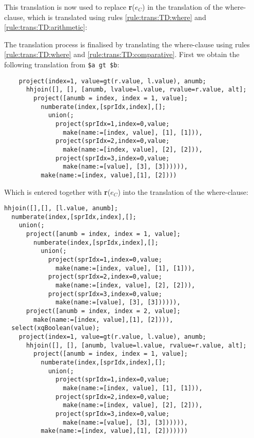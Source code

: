 This translation is now used to replace \textbf{r}($e_C$) in the translation
of the where-clause, which is translated using rules \ref{rule:trans:TD:where}
and \ref{rule:trans:TD:arithmetic}:

The translation process is finalised by translating the where-clause using rules
\ref{rule:trans:TD:where} and \ref{rule:trans:TD:comparative}. First we
obtain the following translation from \texttt{\$a gt \$b}:

\begin{Verbatim}
    project(index=1, value=gt(r.value, l.value), anumb;
      hhjoin([], [], [anumb, lvalue=l.value, rvalue=r.value, alt];
        project([anumb = index, index = 1, value];
          numberate(index,[sprIdx,index],[];
            union(;
              project(sprIdx=1,index=0,value;
                make(name:=[index, value], [1], [1])),
              project(sprIdx=2,index=0,value;
                make(name:=[index, value], [2], [2])),
              project(sprIdx=3,index=0,value;
                make(name:=[value], [3], [3]))))),
          make(name:=[index, value],[1], [2])))
\end{Verbatim}

Which is entered together with \textbf{r}($e_C$) into the translation of the
where-clause:

\begin{Verbatim}
hhjoin([],[], [l.value, anumb];
  numberate(index,[sprIdx,index],[];
    union(;
      project([anumb = index, index = 1, value];
        numberate(index,[sprIdx,index],[];
          union(;
            project(sprIdx=1,index=0,value;
              make(name:=[index, value], [1], [1])),
            project(sprIdx=2,index=0,value;
              make(name:=[index, value], [2], [2])),
            project(sprIdx=3,index=0,value;
              make(name:=[value], [3], [3]))))),
      project([anumb = index, index = 2, value];
        make(name:=[index, value],[1], [2]))),
  select(xqBoolean(value);
    project(index=1, value=gt(r.value, l.value), anumb;
      hhjoin([], [], [anumb, lvalue=l.value, rvalue=r.value, alt];
        project([anumb = index, index = 1, value];
          numberate(index,[sprIdx,index],[];
            union(;
              project(sprIdx=1,index=0,value;
                make(name:=[index, value], [1], [1])),
              project(sprIdx=2,index=0,value;
                make(name:=[index, value], [2], [2])),
              project(sprIdx=3,index=0,value;
                make(name:=[value], [3], [3]))))),
          make(name:=[index, value],[1], [2]))))))
\end{Verbatim}


